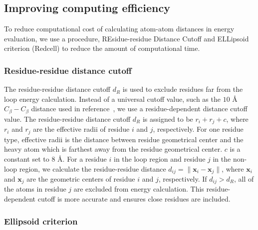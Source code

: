 \subsection*{Improving computing efficiency}

To reduce computational cost of calculating atom-atom distances in
energy evaluation, we use a procedure, REsidue-residue Distance
Cutoff and ELLipsoid criterion ({\sc Redcell}) to reduce the amount
of computational time.


\subsubsection*{Residue-residue distance cutoff}

The residue-residue distance cutoff $d_{R}$ is used to exclude
residues far from the loop energy calculation. Instead of a
universal cutoff value, such as the $10$ \r{A}\ $C_{\beta} -
C_{\beta}$ distance used in reference~\cite{leaver2011}, we use a
residue-dependent distance cutoff value. The residue-residue
distance cutoff $d_R$ is assigned to be $r_{i} + r_{j} + c$, where
$r_i$ and $r_j$ are the effective radii of residue $i$ and $j$,
respectively. For one residue type, effective radii is the distance
between residue geometrical center and the heavy atom which is
farthest away from the residue geometrical center. $c$ is a constant
set to $8$ \r{A}. For a residue $i$ in the loop region and residue
$j$ in the non-loop region, we calculate the residue-residue
distance $d_{ij} = \|\mathbf{x}_i - \mathbf{x}_j\|$, where
$\mathbf{x}_i$ and $\mathbf{x}_j$ are the geometric centers of
residue $i$ and $j$, respectively. If $d_{ij} > d_R$, all of the
atoms in residue $j$ are excluded from energy calculation. This
residue-dependent cutoff is more accurate and ensures close residues
are included.

\subsubsection*{Ellipsoid criterion}

